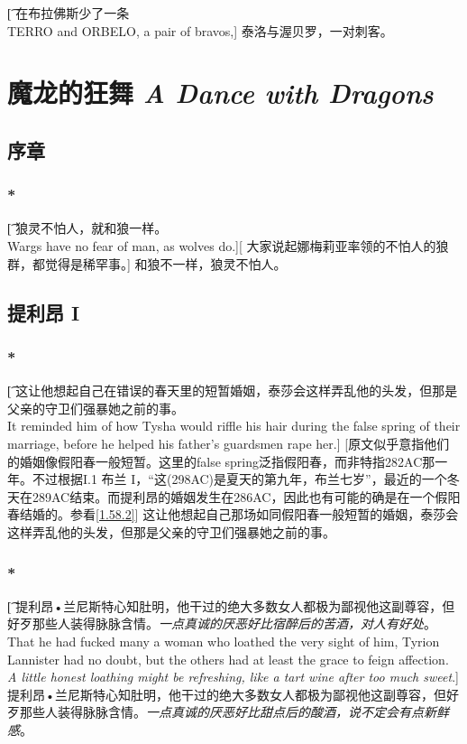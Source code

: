 \documentclass[12pt,a4paper]{article}
\begin{document}
\subsubsection{}\t[		
	在布拉佛斯{\color{red}少了一条}\\
	TERRO and ORBELO, a pair of bravos,]
	{\large 泰洛}与{\large 渥贝罗}，一对刺客。
	
\newpage\section{魔龙的狂舞 \emph{A Dance with Dragons}}	
\setcounter{subsection}{-1}
\subsection{序章}
\subsubsection{\color{red}*}\t[
	狼灵不怕人，就和狼一样。\\
	Wargs have no fear of man, as wolves do.][
	大家说起娜梅莉亚率领的不怕人的狼群，都觉得是稀罕事。]
	和狼不一样，狼灵不怕人。
	
\subsection{提利昂 I}
\subsubsection{\color{red}*}\t[		
这让他想起自己在错误的春天里的短暂婚姻，泰莎会这样弄乱他的头发，但那是父亲的守卫们强暴她之前的事。\\		
It reminded him of how Tysha would riffle his hair during the false spring of their marriage, before he helped his father's guardsmen rape her.]		
[原文似乎意指他们的婚姻像假阳春一般短暂。这里的false spring泛指假阳春，而非特指282AC那一年。不过根据I.1 布兰 I，“这(298AC)是夏天的第九年，布兰七岁”，最近的一个冬天在289AC结束。而提利昂的婚姻发生在286AC，因此也有可能的确是在一个假阳春结婚的。参看\ref{1.58.2}]		
这让他想起自己那场如同假阳春一般短暂的婚姻，泰莎会这样弄乱他的头发，但那是父亲的守卫们强暴她之前的事。		

\subsubsection{\color{red}*}\t[
	提利昂•兰尼斯特心知肚明，他干过的绝大多数女人都极为鄙视他这副尊容，但好歹那些人装得脉脉含情。\emph{一点真诚的厌恶好比宿醉后的苦酒，对人有好处}。\\
	That he had fucked many a woman who loathed the very sight of him, Tyrion Lannister had no doubt, but the others had at least the grace to feign affection. \emph{A little honest loathing might be refreshing, like a tart wine after too much sweet}.]
	提利昂•兰尼斯特心知肚明，他干过的绝大多数女人都极为鄙视他这副尊容，但好歹那些人装得脉脉含情。\emph{一点真诚的厌恶好比甜点后的酸酒，说不定会有点新鲜感}。
	
\end{document}
